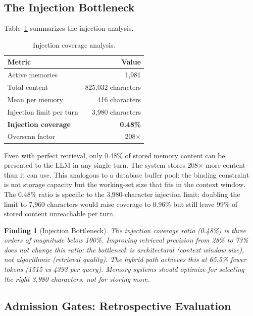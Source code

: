 \documentclass{llncs}
\newtheorem{finding}{Finding}
\begin{document}
\subsection{The Injection Bottleneck}


Table~\ref{tab:injection} summarizes the injection analysis.

\begin{table}[h]
\centering
\caption{Injection coverage analysis.}
\label{tab:injection}
\begin{tabular}{lr}
\toprule
Metric & Value \\
\midrule
Active memories & 1,981 \\
Total content & 825,032 characters \\
Mean per memory & 416 characters \\
Injection limit per turn & 3,980 characters \\
\textbf{Injection coverage} & \textbf{0.48\%} \\
Overscan factor & 208$\times$ \\
\bottomrule
\end{tabular}
\end{table}

Even with perfect retrieval, only 0.48\% of stored memory content can be presented to the LLM in any single turn. The system stores 208$\times$ more content than it can use. This analogous to a database buffer pool: the binding constraint is not storage capacity but the working-set size that fits in the context window. The 0.48\% ratio is specific to the 3,980-character injection limit; doubling the limit to 7,960 characters would raise coverage to 0.96\% but still leave 99\% of stored content unreachable per turn.

\begin{finding}[Injection Bottleneck]
The injection coverage ratio (0.48\%) is three orders of magnitude below 100\%. Improving retrieval precision from 28\% to 73\% does not change this ratio: the bottleneck is architectural (context window size), not algorithmic (retrieval quality). The hybrid path achieves this at 65.5\% fewer tokens (1{}515 vs 4{}393 per query). Memory systems should optimize for \emph{selecting the right 3,980 characters}, not for storing more.
\end{finding}

\subsection{Admission Gates: Retrospective Evaluation}
\end{document}
